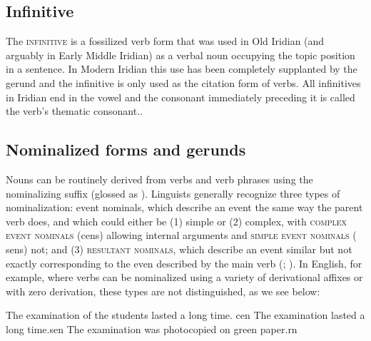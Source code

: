 \subsection{Infinitive}\label{sec:infinitive}

The {\scshape infinitive} is a fossilized verb form that was used in Old
Iridian (and arguably in Early Middle Iridian) as a verbal noun occupying the topic position in a
sentence. In Modern Iridian this use has been completely supplanted by the
gerund and the infinitive is only used as the citation
form of verbs. All infinitives in Iridian end in the vowel
 and the consonant immediately preceding it is called the verb's
thematic consonant..

\subsection{Nominalized forms and gerunds}\label{sec:nominalized}

Nouns can be routinely derived from verbs and verb phrases using the
nominalizing suffix  (glossed as \Nz{}). Linguists generally recognize
three types of nominalization: event nominals, which describe an event the same
way the parent verb does, and which could either be (1) simple or (2) complex,
with {\scshape complex event nominals} ({\sc cen}s) allowing
internal arguments and {\scshape simple event nominals} ({\sc
sen}s) not; and (3) {\scshape resultant
nominals}, which describe an event similar
but not exactly corresponding to the even described by the main verb
(\cite{grimshaw1990}; \cite{moulton2014}). In English, for
example, where verbs can be nominalized using a variety of derivational affixes
or with zero derivation, these types are not distinguished, as we see below:

\pex[interpartskip=0pt]
	\a The examination of the students lasted a long time. \hfill {\sc cen}
	\a The examination lasted a long time.\hfill {\sc sen}
	\a The examination was photocopied on green paper.\hfill {\sc rn}\\
\xe

